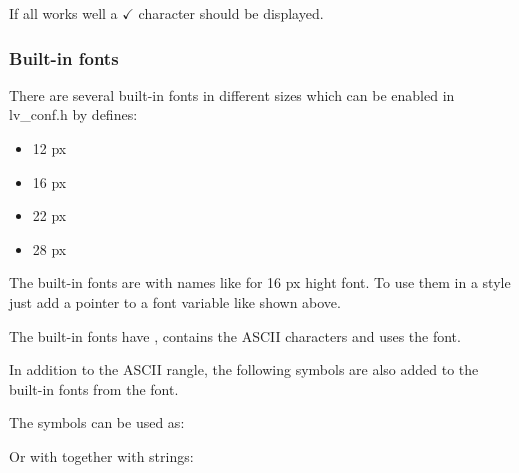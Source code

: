 \documentclass[letterpaper,10pt,english]{sphinxmanual}
\begin{document}
If all works well a \(\checkmark\) character should be displayed.


\subsubsection{Built-in fonts}
\label{\detokenize{overview/fonts:built-in-fonts}}
There are several built-in fonts in different sizes which can be enabled in lv\_conf.h by  defines:
\begin{itemize}
\item {} 
 12 px

\item {} 
 16 px

\item {} 
 22 px

\item {} 
 28 px

\end{itemize}

The built-in fonts are  with names like  for 16 px hight font. To use them in a style just add a pointer to a font variable like shown above.

The built-in fonts have , contains the ASCII characters and uses the  font.

In addition to the ASCII rangle, the following symbols are also added to the built-in fonts from the  font.


The symbols can be used as:

\begin{sphinxVerbatim}[commandchars=\\\{\}]
 
\end{sphinxVerbatim}

Or with together with strings:

\begin{sphinxVerbatim}[commandchars=\\\{\}]
  
\end{sphinxVerbatim}
\end{document}

